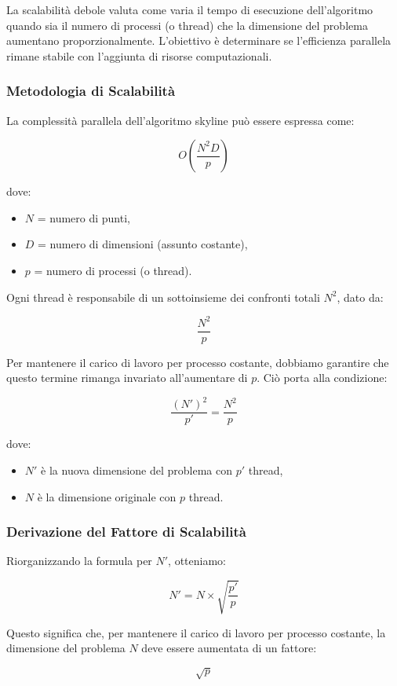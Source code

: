 \documentclass[letterpaper,11pt,leqno]{article}
\begin{document}
La scalabilità debole valuta come varia il tempo di esecuzione dell'algoritmo quando sia il numero di processi (o thread) che la dimensione del problema aumentano proporzionalmente. L'obiettivo è determinare se l'efficienza parallela rimane stabile con l'aggiunta di risorse computazionali.

\subsubsection{Metodologia di Scalabilità}
La complessità parallela dell'algoritmo skyline può essere espressa come:

\[
O\left(\frac{N^2 D}{p}\right)
\]

dove:
\begin{itemize}
    \item \( N \) = numero di punti,
    \item \( D \) = numero di dimensioni (assunto costante),
    \item \( p \) = numero di processi (o thread).
\end{itemize}

Ogni thread è responsabile di un sottoinsieme dei confronti totali \( N^2 \), dato da:

\[
\frac{N^2}{p}
\]

Per mantenere il carico di lavoro per processo costante, dobbiamo garantire che questo termine rimanga invariato all'aumentare di \( p \). Ciò porta alla condizione:

\[
\frac{(N')^2}{p'} = \frac{N^2}{p}
\]

dove:
\begin{itemize}
    \item \( N' \) è la nuova dimensione del problema con \( p' \) thread,
    \item \( N \) è la dimensione originale con \( p \) thread.
\end{itemize}

\subsubsection{Derivazione del Fattore di Scalabilità}
Riorganizzando la formula per \( N' \), otteniamo:

\[
N' = N \times \sqrt{\frac{p'}{p}}
\]

Questo significa che, per mantenere il carico di lavoro per processo costante, la dimensione del problema \( N \) deve essere aumentata di un fattore:

\[
\sqrt{p}
\]
\end{document}
